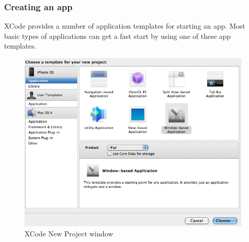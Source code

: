 \documentclass[10pt]{beamer}
\begin{document}
    
\begin{frame}[fragile]
  \frametitle{Creating an app}
  XCode provides a number of application templates for starting an app.  Most basic types of applications can get a fast start by using one of these app templates. \begin{figure}[htb]
  \begin{center}
  
  \includegraphics[scale=0.35]{ProjectCreator.png}
              
  \caption{XCode New Project window}
  \end{center}
  \end{figure}

\end{frame}
\end{document}
